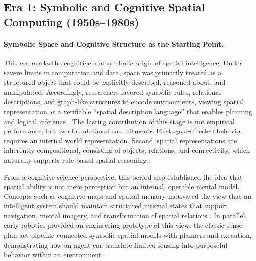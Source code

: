 













\subsection{Era 1: Symbolic and Cognitive Spatial Computing (1950s--1980s)}
\label{subsec:era-symbolic-cognitive}

\paragraph{Symbolic Space and Cognitive Structure as the Starting Point.}
This era marks the cognitive and symbolic origin of spatial intelligence. 
Under severe limits in computation and data, space was primarily treated as a structured object that could be explicitly described, reasoned about, and manipulated.
Accordingly, researchers favored symbolic rules, relational descriptions, and graph-like structures to encode environments, viewing spatial representation as a verifiable ``spatial description language'' that enables planning and logical inference \cite{kuipers1978modeling,kuipers2000spatial}.
The lasting contribution of this stage is not empirical performance, but two foundational commitments.
First, goal-directed behavior requires an internal world representation.
Second, spatial representations are inherently compositional, consisting of objects, relations, and connectivity, which naturally supports rule-based spatial reasoning \cite{sun1995robust}.


From a cognitive science perspective, this period also established the idea that spatial ability is not mere perception but an internal, operable mental model.
Concepts such as cognitive maps and spatial memory motivated the view that an intelligent system should maintain structured internal states that support navigation, mental imagery, and transformation of spatial relations \cite{eichenbaum1999hippocampus,allen2004human}.
In parallel, early robotics provided an engineering prototype of this view: the classic sense-plan-act pipeline connected symbolic spatial models with planners and execution, demonstrating how an agent can translate limited sensing into purposeful behavior within an environment \cite{nilsson1984shakey,Arkin1998BehaviorBased}.

